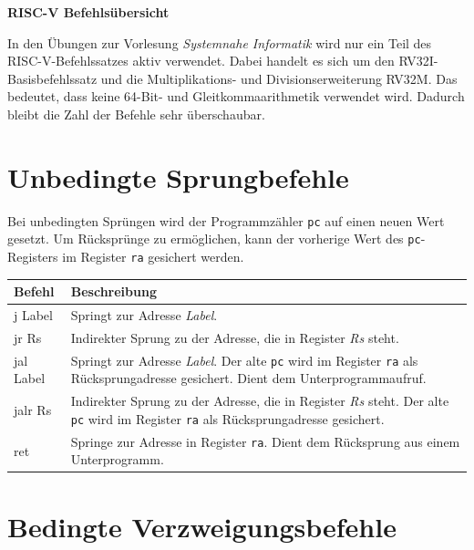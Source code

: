 \documentclass[a4paper,11pt]{article}
\begin{document}
	
	\begin{center}
		\Huge{\textbf{RISC-V Befehlsübersicht}}
	\end{center}
	\vspace{12pt}
	In den Übungen zur Vorlesung \textit{Systemnahe Informatik} wird nur ein Teil des RISC-V-Befehlssatzes aktiv verwendet.
	Dabei handelt es sich um den RV32I-Basisbefehlssatz und die Multiplikations- und Divisionserweiterung RV32M.
	Das bedeutet, dass keine 64-Bit- und Gleitkommaarithmetik verwendet wird.
	Dadurch bleibt die Zahl der Befehle sehr überschaubar.
	
	\section{Unbedingte Sprungbefehle}
	
	Bei unbedingten Sprüngen wird der Programmzähler \texttt{pc} auf einen neuen Wert gesetzt.
	Um Rücksprünge zu ermöglichen, kann der vorherige Wert des \texttt{pc}-Registers im Register \texttt{ra} gesichert werden.
	
	\begin{center}
		\begin{tabular}{>{\ttfamily}lp{11cm}}
			\toprule
			\normalfont\textbf{Befehl} & \textbf{Beschreibung} \\
			\midrule
			j Label   & Springt zur Adresse \textit{Label}. \\
			jr Rs     & Indirekter Sprung zu der Adresse, die in Register \textit{Rs} steht. \\
			jal Label & Springt zur Adresse \textit{Label}.
						Der alte \texttt{pc} wird im Register \texttt{ra} als Rücksprungadresse gesichert.
						Dient dem Unterprogrammaufruf. \\
			jalr Rs   & Indirekter Sprung zu der Adresse, die in Register \textit{Rs} steht.
						Der alte \texttt{pc} wird im Register \texttt{ra} als Rücksprungadresse gesichert. \\
			ret       & Springe zur Adresse in Register \texttt{ra}. Dient dem Rücksprung aus einem Unterprogramm. \\
			\bottomrule
		\end{tabular}
	\end{center}
	
	\section{Bedingte Verzweigungsbefehle}
	
\end{document}
